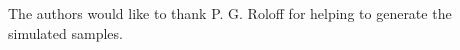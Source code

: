 \documentclass[a4paper,11pt]{article}
\begin{document}





\acknowledgments

The authors would like to thank P. G. Roloff for helping to generate the simulated samples. 


















\end{document}
